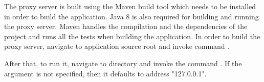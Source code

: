 \documentclass[..thesis.tex]{subfiles}
\begin{document}
The proxy server is built using the Maven build tool which needs to be installed in order to build the application.
Java 8 is also required for building and running the proxy server.
Maven handles the compilation and the dependencies of the project and runs all the tests when building the application.
In order to build the proxy server, navigate to application source root and invoke command .

\begin{sloppypar}
  After that, to run it, navigate to directory  and invoke the command
  .
  If the  argument is not specified, then it defaults to address "127.0.0.1".
\end{sloppypar}
\end{document}
